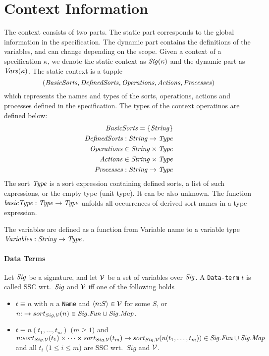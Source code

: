 \documentclass[fleqn,a4paper,dvips]{article}
\newcommand{\Sig}{\nm{Sig}}
\newcommand{\Fun}{\nm{Fun}}
\newcommand{\NV}{{\cal V}}
\newcommand{\Type}{\nm{Type}}
\newcommand{\String}{\nm{String}}
\begin{document}
\section{Context Information}
The context consists of two parts. The static part corresponds to the
global information in the specification. The dynamic part contains the
definitions of the variables, and can change depending on the scope.
Given a context of a specification $\kappa$, we denote the static context as
$\mathit{Sig(\kappa)}$ and the dynamic part as $\mathit{Vars}(\kappa)$.
The static context is a tupple
\[(\mathit{BasicSorts},\mathit{DefinedSorts},\mathit{Operations},\mathit{Actions},\mathit{Processes})\]
which represents the names and types of the sorts, operations, actions and processes
defined in the specification.
The types of the context operatinos are defined below:
\begin{align*}
\nm{BasicSorts}=\set{\String}\\
\func{\nm{DefinedSorts}}{\String}{\Type}\\
\nm{Operations}\in\String\x\Type\\
\nm{Actions}\in\String\x\Type\\
\func{\nm{Processes}}{\String}{\Type}
\end{align*}
The sort $\Type$ is a sort expression containing defined sorts, a list
of such expressions, or the empty type (unit type).  It can be also
unknown.  The function $\func{\nm{basicType}}{\Type}{\Type}$ unfolds
all occurrences of derived sort names in a type expression.

The variables are defined as a function from Variable name to a variable type
$\func{\nm{Variables}}{\String}{\Type}$.

\paragraph{Data Terms}
Let $\Sig$ be a signature, and let $\NV$ be a set of variables over
$\Sig$.
A {\tt Data-term} $t$ is called SSC wrt.\ $\Sig$ and $\NV$ iff one of
the following holds
\begin{itemize}
\item
  $t\equiv n$ with $n$ a {\tt Name} and
  $\langle n\ap S\rangle\in \NV$ for some $S$, or
  $n\ap  \rightarrow sort_{Sig,\NV}(n)\in \Sig.\Fun\cup\Sig.\Map$.
\item
  $t\equiv n(t_1,\ldots,t_m)$ ($m\geq 1$) and
  $n\ap sort_{Sig,\NV}(t_1)\times\cdots\times sort_{Sig,\NV}(t_m)
  \rightarrow sort_{Sig,\NV}(n(t_1,\ldots,t_m))\in \Sig.\Fun\cup\Sig.\Map$ and
  all
  $t_i$ ($1\leq i\leq m$) are SSC wrt.\ $Sig$ and $\NV$.
\end{itemize}
\end{document}
